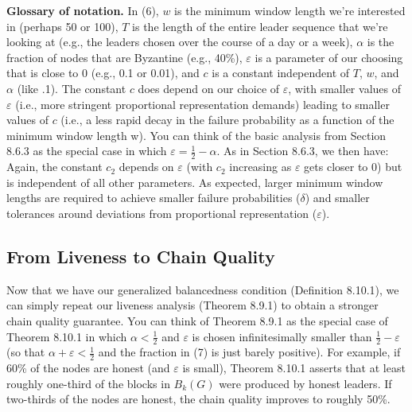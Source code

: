 \noindent
\textbf{Glossary of notation.} In (6), $w$ is the minimum window length we’re interested in (perhaps 50 or 100), $T$ is the length of the entire leader sequence that we’re looking at (e.g.,
the leaders chosen over the course of a day or a week), $\alpha$ is the fraction of nodes that are
Byzantine (e.g., 40\%), $\varepsilon$ is a parameter of our choosing that is close to 0 (e.g., 0.1 or 0.01),
and $c$ is a constant independent of $T$, $w$, and $\alpha$ (like .1). The constant $c$ does depend on our choice of $\varepsilon$, with smaller values of $\varepsilon$ (i.e., more stringent proportional representation
demands) leading to smaller values of $c$ (i.e., a less rapid decay in the failure probability
as a function of the minimum window length w). You can think of the basic analysis from
Section 8.6.3 as the special case in which $\varepsilon = \frac{1}{2} - \alpha$.
As in Section 8.6.3, we then have:
Again, the constant $c_2$ depends on $\varepsilon$ (with $c_2$ increasing as $\varepsilon$ gets closer to 0) but is independent of all other parameters. As expected, larger minimum window lengths are required
to achieve smaller failure probabilities ($\delta$) and smaller tolerances around deviations from
proportional representation ($\varepsilon$).

\subsection{From Liveness to Chain Quality}
Now that we have our generalized balancedness condition (Definition 8.10.1), we can simply
repeat our liveness analysis (Theorem 8.9.1) to obtain a stronger chain quality guarantee.
You can think of Theorem 8.9.1 as the special case of Theorem 8.10.1 in which $\alpha < \frac{1}{2}$ and $\varepsilon$ is
chosen infinitesimally smaller than $\frac{1}{2} - \varepsilon$ (so that $\alpha + \varepsilon < \frac{1}{2}$ and the fraction in (7) is just
barely positive).
For example, if 60\% of the nodes are honest (and $\varepsilon$ is small), Theorem 8.10.1 asserts that at
least roughly one-third of the blocks in $B_k(G)$ were produced by honest leaders. If two-thirds
of the nodes are honest, the chain quality improves to roughly 50\%.\\

